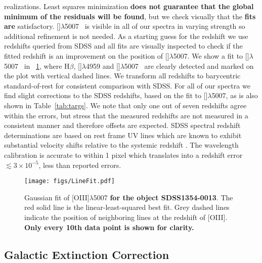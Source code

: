 \documentclass{aa}    %
\newcommand{\figref}[1]{\ref{fig:#1}}
\newcommand{\Fig}[1]{\figurename~\figref{#1}}
\newcommand{\figlabel}[1]{\label{fig:#1}}
\newcommand{\Tab}[1]{Table~\ref{tab:#1}}
\newcommand{\tab}[1]{\Tab{#1}}
\newcommand{\sectlabel}[1]{\label{sect:#1}}
\newcommand{\hb}{H$\beta$}
\newcommand{\oiii}{[\ion{O}{iii}]$\lambda$5007}
\begin{document}
realizations. Least squares minimization \textbf{does not guarantee that the global minimum of the
 residuals will be found}, but we check
visually that the \textbf{fits are} satisfactory.  \oiii~ is visible in all of
our spectra in varying strength so additional refinement is not
needed. As a starting guess for the redshift we use redshifts queried
from SDSS and all fits are visually inspected to check if the fitted
redshift is an improvement on the position of \oiii. We show a fit to
\oiii~ in \Fig{linefit}, where \hb, []$\lambda$4959 and
\oiii~ are clearly detected and marked on the plot with vertical
dashed lines. We transform all redshifts to barycentric standard-of-rest for consistent
comparison with SDSS. For all of our spectra we find slight
corrections to the SDSS redshifts, based on the fit to \oiii, as is
also shown in \tab{targs}. We note that only one out of seven
redshifts agree within the errors, but stress that the measured
redshifts are not measured in a consistent manner and therefore
offsets are expected. SDSS spectral redshift determinations are based
on rest frame UV lines which are known to exhibit substantial velocity
shifts relative to the systemic redshift \citep{Tytler1992,
  Hewett2010}. The wavelength calibration is accurate to within 1
pixel \citep{Kruhler2015} which translates into a redshift error
$\lesssim 3\times 10^{-5}$, less than reported errors.

\begin{figure}[t!]
  \centering
  \texttt{[image: figs/LineFit.pdf]}
  \caption[]{Gaussian fit of [OIII]$\lambda$5007 \textbf{for the object SDSS1354-0013}. The red solid line is the
linear-least-squared best fit. Grey dashed lines indicate the
position of neighboring lines at the redshift of [OIII]. \textbf{Only every 10th data point is shown for clarity.}}
  \figlabel{linefit}
\end{figure}




\subsection{Galactic Extinction Correction} \sectlabel{extinct}
\end{document}

